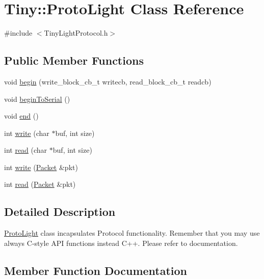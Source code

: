 \hypertarget{classTiny_1_1ProtoLight}{}\section{Tiny\+:\+:Proto\+Light Class Reference}
\label{classTiny_1_1ProtoLight}


{\ttfamily \#include $<$Tiny\+Light\+Protocol.\+h$>$}

\subsection*{Public Member Functions}
\begin{DoxyCompactItemize}
\item 
void \hyperlink{classTiny_1_1ProtoLight_ad27dfcef54a8316228469ef0a4267962}{begin} (write\+\_\+block\+\_\+cb\+\_\+t writecb, read\+\_\+block\+\_\+cb\+\_\+t readcb)
\item 
void \hyperlink{classTiny_1_1ProtoLight_a50bf63fe1891edda48980ca2893485d7}{begin\+To\+Serial} ()
\item 
void \hyperlink{classTiny_1_1ProtoLight_a948b2a0e37177b7434581adc64b36497}{end} ()
\item 
int \hyperlink{classTiny_1_1ProtoLight_a46a27ee9d0b55c88672c98abf04dbdce}{write} (char $\ast$buf, int size)
\item 
int \hyperlink{classTiny_1_1ProtoLight_acf18a8b73ee6c6394270c903ad7882b8}{read} (char $\ast$buf, int size)
\item 
int \hyperlink{classTiny_1_1ProtoLight_abf2966531f8ed7dba44079f00eefded2}{write} (\hyperlink{classTiny_1_1Packet}{Packet} \&pkt)
\item 
int \hyperlink{classTiny_1_1ProtoLight_a96c56b10b4eee28c09b291461c66fa54}{read} (\hyperlink{classTiny_1_1Packet}{Packet} \&pkt)
\end{DoxyCompactItemize}


\subsection{Detailed Description}
\hyperlink{classTiny_1_1ProtoLight}{Proto\+Light} class incapsulates Protocol functionality. Remember that you may use always C-\/style A\+P\+I functions instead C++. Please refer to documentation. 

\subsection{Member Function Documentation}
\hypertarget{classTiny_1_1ProtoLight_ad27dfcef54a8316228469ef0a4267962}{}

